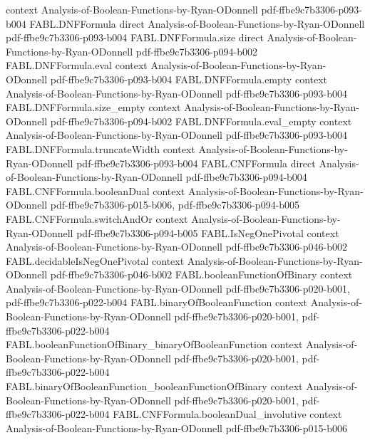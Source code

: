 \begin{theorem}
  {context}
  {Analysis-of-Boolean-Functions-by-Ryan-ODonnell}
  {pdf-ffbe9c7b3306-p093-b004}
\proofstep
  {FABL.DNFFormula}
  {direct}
  {Analysis-of-Boolean-Functions-by-Ryan-ODonnell}
  {pdf-ffbe9c7b3306-p093-b004}
\proofstep
  {FABL.DNFFormula.size}
  {direct}
  {Analysis-of-Boolean-Functions-by-Ryan-ODonnell}
  {pdf-ffbe9c7b3306-p094-b002}
\proofstep
  {FABL.DNFFormula.eval}
  {context}
  {Analysis-of-Boolean-Functions-by-Ryan-ODonnell}
  {pdf-ffbe9c7b3306-p093-b004}
\proofstep
  {FABL.DNFFormula.empty}
  {context}
  {Analysis-of-Boolean-Functions-by-Ryan-ODonnell}
  {pdf-ffbe9c7b3306-p093-b004}
\proofstep
  {FABL.DNFFormula.size_empty}
  {context}
  {Analysis-of-Boolean-Functions-by-Ryan-ODonnell}
  {pdf-ffbe9c7b3306-p094-b002}
\proofstep
  {FABL.DNFFormula.eval_empty}
  {context}
  {Analysis-of-Boolean-Functions-by-Ryan-ODonnell}
  {pdf-ffbe9c7b3306-p093-b004}
\proofstep
  {FABL.DNFFormula.truncateWidth}
  {context}
  {Analysis-of-Boolean-Functions-by-Ryan-ODonnell}
  {pdf-ffbe9c7b3306-p093-b004}
\proofstep
  {FABL.CNFFormula}
  {direct}
  {Analysis-of-Boolean-Functions-by-Ryan-ODonnell}
  {pdf-ffbe9c7b3306-p094-b004}
\proofstep
  {FABL.CNFFormula.booleanDual}
  {context}
  {Analysis-of-Boolean-Functions-by-Ryan-ODonnell}
  {pdf-ffbe9c7b3306-p015-b006,
    pdf-ffbe9c7b3306-p094-b005}
\proofstep
  {FABL.CNFFormula.switchAndOr}
  {context}
  {Analysis-of-Boolean-Functions-by-Ryan-ODonnell}
  {pdf-ffbe9c7b3306-p094-b005}
\proofstep
  {FABL.IsNegOnePivotal}
  {context}
  {Analysis-of-Boolean-Functions-by-Ryan-ODonnell}
  {pdf-ffbe9c7b3306-p046-b002}
\proofstep
  {FABL.decidableIsNegOnePivotal}
  {context}
  {Analysis-of-Boolean-Functions-by-Ryan-ODonnell}
  {pdf-ffbe9c7b3306-p046-b002}
\proofstep
  {FABL.booleanFunctionOfBinary}
  {context}
  {Analysis-of-Boolean-Functions-by-Ryan-ODonnell}
  {pdf-ffbe9c7b3306-p020-b001,
    pdf-ffbe9c7b3306-p022-b004}
\proofstep
  {FABL.binaryOfBooleanFunction}
  {context}
  {Analysis-of-Boolean-Functions-by-Ryan-ODonnell}
  {pdf-ffbe9c7b3306-p020-b001,
    pdf-ffbe9c7b3306-p022-b004}
\proofstep
  {FABL.booleanFunctionOfBinary_binaryOfBooleanFunction}
  {context}
  {Analysis-of-Boolean-Functions-by-Ryan-ODonnell}
  {pdf-ffbe9c7b3306-p020-b001,
    pdf-ffbe9c7b3306-p022-b004}
\proofstep
  {FABL.binaryOfBooleanFunction_booleanFunctionOfBinary}
  {context}
  {Analysis-of-Boolean-Functions-by-Ryan-ODonnell}
  {pdf-ffbe9c7b3306-p020-b001,
    pdf-ffbe9c7b3306-p022-b004}
\proofstep
  {FABL.CNFFormula.booleanDual_involutive}
  {context}
  {Analysis-of-Boolean-Functions-by-Ryan-ODonnell}
  {pdf-ffbe9c7b3306-p015-b006}
\proofstep

\end{theorem}
